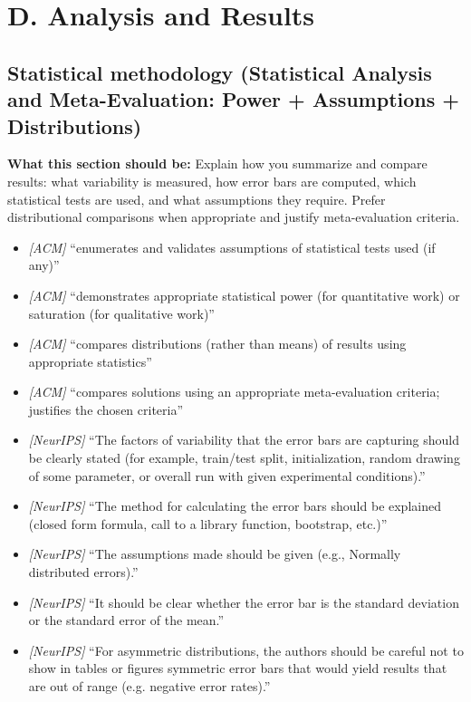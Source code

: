 \documentclass[11pt]{article}
\begin{document}
\section*{D. Analysis and Results}

\subsection{Statistical methodology (Statistical Analysis and Meta-Evaluation: Power + Assumptions + Distributions)}
\noindent\textbf{What this section should be:}
Explain how you summarize and compare results: what variability is measured, how error bars are computed, which statistical tests are used, and what assumptions they require. Prefer distributional comparisons when appropriate and justify meta-evaluation criteria.
\begin{itemize}
  \item \textit{[ACM]} ``enumerates and validates assumptions of statistical tests used (if any)''
  \item \textit{[ACM]} ``demonstrates appropriate statistical power (for quantitative work) or saturation (for qualitative work)''
  \item \textit{[ACM]} ``compares distributions (rather than means) of results using appropriate statistics''
  \item \textit{[ACM]} ``compares solutions using an appropriate meta-evaluation criteria; justifies the chosen criteria''
  \item \textit{[NeurIPS]} ``The factors of variability that the error bars are capturing should be clearly stated (for example, train/test split, initialization, random drawing of some parameter, or overall run with given experimental conditions).''
  \item \textit{[NeurIPS]} ``The method for calculating the error bars should be explained (closed form formula, call to a library function, bootstrap, etc.)''
  \item \textit{[NeurIPS]} ``The assumptions made should be given (e.g., Normally distributed errors).''
  \item \textit{[NeurIPS]} ``It should be clear whether the error bar is the standard deviation or the standard error of the mean.''
  \item \textit{[NeurIPS]} ``For asymmetric distributions, the authors should be careful not to show in tables or figures symmetric error bars that would yield results that are out of range (e.g. negative error rates).''
\end{itemize}
\end{document}

